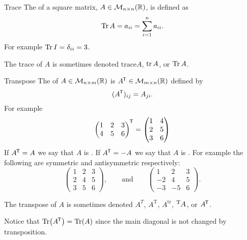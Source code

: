 \begin{definition}{Trace}{}
    The  of a square matrix, \(A \in\mathcal{M}_{{n}\times{n}}({\mathbb{R}})\), is defined as
    \[\Tr A = a_{ii} = \sum_{i=1}^{n} a_{ii}.\]
    For example \(\Tr I = \delta_{ii} = 3\).
\end{definition}
\begin{notation*}{}
    The trace of \(A\) is sometimes denoted \(\mathrm{trace}A\), \(\tr A\), or \(\Tr A\).
\end{notation*}
\begin{definition}{Transpose}{}
    The  of \(A\in\mathcal{M}_{{n}\times{m}}({\mathbb{R}})\) is \(A^{\mkern-1.5mu\mathsf{T}}\in\mathcal{M}_{{m}\times{n}}({\mathbb{R}})\) defined by
    \[(A^{\mkern-1.5mu\mathsf{T}})_{ij} = A_{ji}.\]
    For example
    \[
    \begin{pmatrix}
        1 & 2 & 3\\
        4 & 5 & 6
    \end{pmatrix}
    ^{\mkern-1.5mu\mathsf{T}}
    =
    \begin{pmatrix}
        1 & 4\\
        2 & 5\\
        3 & 6
    \end{pmatrix}
    \]
    If \(A^{\mkern-1.5mu\mathsf{T}} = A\) we say that \(A\) is .
    If \(A^{\mkern-1.5mu\mathsf{T}} = -A\) we say that \(A\) is .
    For example the following are symmetric and antisymmetric respectively:
    \[
    \begin{pmatrix}
        1 & 2 & 3\\
        2 & 4 & 5\\
        3 & 5 & 6
    \end{pmatrix}
    , \qquad\text{and}\qquad
    \begin{pmatrix}
        1 & 2 & 3\\
        -2 & 4 & 5\\
        -3 & -5 & 6
    \end{pmatrix}
    .
    \]
\end{definition}
\begin{notation}{}{}
    The transpose of \(A\) is sometimes denoted \(A^T\), \(A^{\mathrm{T}}\), \(A^{\mathrm{tr}}\), \(\tensor[^{\mathrm{T}}]{A}{}\), or \(A^{\mkern-1.5mu\mathsf{T}}\).
\end{notation}
Notice that \(\Tr(A^{\mkern-1.5mu\mathsf{T}}) = \Tr(A)\) since the main diagonal is not changed by transposition.
